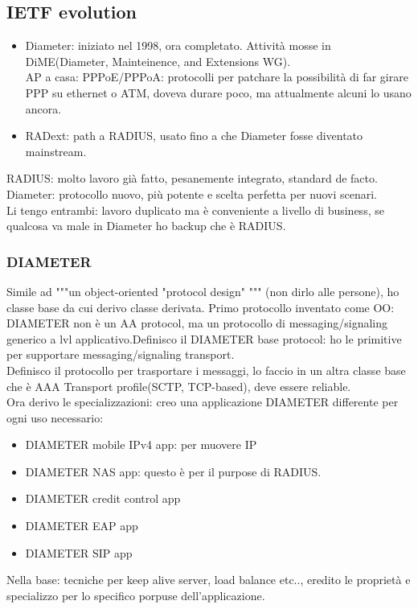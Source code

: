 \documentclass[16px]{article}
\begin{document}
\subsection{IETF evolution}
\begin{itemize}
\item Diameter: iniziato nel 1998, ora completato. Attività mosse in DiME(Diameter, Mainteinence, and Extensions WG).\\ AP a casa: PPPoE/PPPoA: protocolli per patchare la possibilità di far girare PPP su ethernet o ATM, doveva durare poco, ma attualmente alcuni lo usano ancora.
\item RADext: path a RADIUS, usato fino a che Diameter fosse diventato mainstream.
\end{itemize}
RADIUS: molto lavoro già fatto, pesanemente integrato, standard de facto. Diameter: protocollo nuovo, più potente e scelta perfetta per nuovi scenari.\\ Li tengo entrambi: lavoro duplicato ma è conveniente a livello di business, se qualcosa va male in Diameter ho backup che è RADIUS.
\subsubsection{DIAMETER}
Simile ad """un object-oriented "protocol design" """ (non dirlo alle persone), ho classe base da cui derivo classe derivata. Primo protocollo inventato come OO: DIAMETER non è un AA protocol, ma un protocollo di messaging/signaling generico a lvl applicativo.Definisco il DIAMETER base protocol: ho le primitive per supportare messaging/signaling transport.\\ Definisco il protocollo per trasportare i messaggi, lo faccio in un altra classe base che è AAA Transport profile(SCTP, TCP-based), deve essere reliable.\\ Ora derivo le specializzazioni: creo una applicazione DIAMETER differente per ogni uso necessario:
\begin{itemize}
\item DIAMETER mobile IPv4 app: per muovere IP
\item DIAMETER NAS app: questo è per il purpose di RADIUS.
\item DIAMETER credit control app
\item DIAMETER EAP app
\item DIAMETER SIP app
\end{itemize}
Nella base: tecniche per keep alive server, load balance etc.., eredito le proprietà e specializzo per lo specifico porpuse dell'applicazione.
\end{document}

